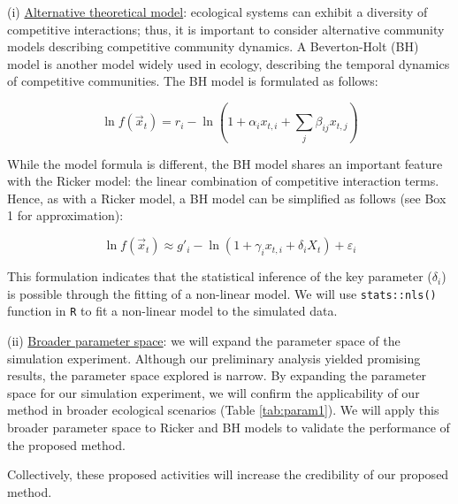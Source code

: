 \documentclass[12pt, class=article, crop=false]{standalone}
\begin{document}
(i) \ul{Alternative theoretical model}: ecological systems can exhibit a diversity of competitive interactions; thus, it is important to consider alternative community models describing competitive community dynamics. 
A Beverton-Holt (BH) model is another model widely used in ecology, describing the temporal dynamics of competitive communities. The BH model is formulated as follows:

\begin{equation}
    \label{eq:bh}
    \ln f(\overset{\rightarrow}{x}_{t}) = r_i - \ln(1 + \alpha_i x_{t,i} + \sum_j \beta_{ij} x_{t,j})
\end{equation}

While the model formula is different, the BH model shares an important feature with the Ricker model: the linear combination of competitive interaction terms.
Hence, as with a Ricker model, a BH model can be simplified as follows (see Box 1 for approximation):

\begin{equation}
    \label{eq:bhmod}
    \ln f(\overset{\rightarrow}{x}_{t}) \approx g'_{i} - \ln(1 + \gamma_i x_{t,i} + \delta_i X_t) + \varepsilon_i
\end{equation}

This formulation indicates that the statistical inference of the key parameter ($\delta_i$) is possible through the fitting of a non-linear model.
We will use \texttt{stats::nls()} function in \texttt{R} to fit a non-linear model to the simulated data.

(ii) \ul{Broader parameter space}: we will expand the parameter space of the simulation experiment.
Although our preliminary analysis yielded promising results, the parameter space explored is narrow.
By expanding the parameter space for our simulation experiment,  we will confirm the applicability of our method in broader ecological scenarios (Table \ref{tab:param1}).
We will apply this broader parameter space to Ricker and BH models to validate the performance of the proposed method.

Collectively, these proposed activities will increase the credibility of our proposed method.
\end{document}
